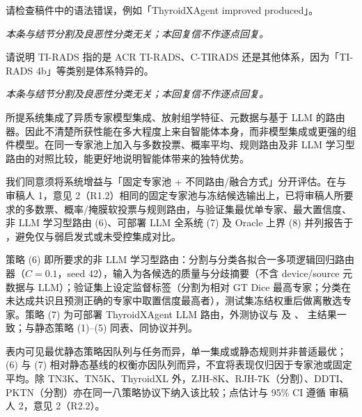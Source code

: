 \begin{reviewercomment}
请检查稿件中的语法错误，例如「ThyroidXAgent improved produced」。
\end{reviewercomment}
\begin{authorresponse}
\noindent\textit{本条与结节分割及良恶性分类无关；本回复信不作逐点回复。}
\end{authorresponse}

\begin{reviewercomment}
请说明 TI-RADS 指的是 ACR TI-RADS、C-TIRADS 还是其他体系，因为「TI-RADS 4b」等类别是体系特异的。
\end{reviewercomment}
\begin{authorresponse}
\noindent\textit{本条与结节分割及良恶性分类无关；本回复信不作逐点回复。}
\end{authorresponse}

\begin{reviewercomment}
所提系统集成了异质专家模型集成、放射组学特征、元数据与基于 LLM 的路由器。因此不清楚所获性能在多大程度上来自智能体本身，而非模型集成或更强的组件模型。在同一专家池上加入与多数投票、概率平均、规则路由及非 LLM 学习型路由的对照比较，能更好地说明智能体带来的独特优势。
\end{reviewercomment}
\begin{authorresponse}
我们同意须将系统增益与「固定专家池 + 不同路由/融合方式」分开评估。在与 审稿人 1，意见 2（R1.2）相同的固定专家池与冻结候选输出上，已将审稿人所要求的多数票、概率/掩膜软投票与规则路由，与验证集最优单专家、最大置信度、非 LLM 学习型路由 (6)、可部署 LLM 全系统 (7) 及 Oracle 上界 (8) 并列报告于 ，避免仅与弱启发式或未受控集成对比。\par
策略 (6) 即所要求的非 LLM 学习型路由：分割与分类各拟合一多项逻辑回归路由器（$C{=}0.1$，seed 42），输入为各候选的质量与分歧摘要（不含 device/source 元数据与 LLM）；验证集上设定监督标签（分割为相对 GT Dice 最高专家；分类在未达成共识且预测正确的专家中取置信度最高者），测试集冻结权重后做离散选专家。策略 (7) 为可部署 ThyroidXAgent LLM 路由，外测协议与  及 、 主结果一致；与静态策略 (1)--(5) 同表、同协议并列。\par
表内可见最优静态策略因队列与任务而异，单一集成或静态规则并非普适最优；(6) 与 (7) 相对静态基线的权衡亦因队列而异，不宜将表现仅归因于专家池或固定平均。除 TN3K、TN5K、ThyroidXL 外，ZJH-8K、RJH-7K（分割）、DDTI、PKTN（分割）亦在同一八策略协议下纳入该比较；点估计与 95\% CI 遵循 审稿人 2，意见 2（R2.2）。\par
\par
\end{authorresponse}

